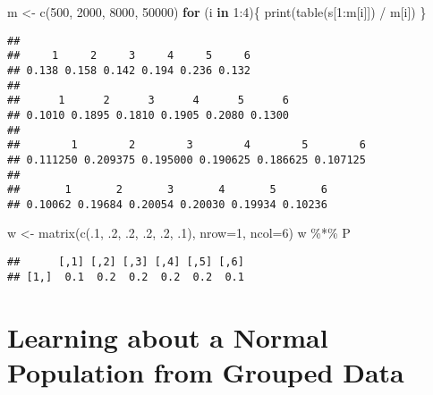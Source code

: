 \documentclass[
]{book}
\newenvironment{Shaded}{\begin{snugshade}}{\end{snugshade}}
\newcommand{\AttributeTok}[1]{\textcolor[rgb]{0.77,0.63,0.00}{#1}}
\newcommand{\ControlFlowTok}[1]{\textcolor[rgb]{0.13,0.29,0.53}{\textbf{#1}}}
\newcommand{\DecValTok}[1]{\textcolor[rgb]{0.00,0.00,0.81}{#1}}
\newcommand{\FunctionTok}[1]{\textcolor[rgb]{0.00,0.00,0.00}{#1}}
\newcommand{\NormalTok}[1]{#1}
\newcommand{\OtherTok}[1]{\textcolor[rgb]{0.56,0.35,0.01}{#1}}
\newcommand{\SpecialCharTok}[1]{\textcolor[rgb]{0.00,0.00,0.00}{#1}}
\begin{document}
\begin{Shaded}
\begin{Highlighting}[]
\NormalTok{m }\OtherTok{\textless{}{-}} \FunctionTok{c}\NormalTok{(}\DecValTok{500}\NormalTok{, }\DecValTok{2000}\NormalTok{, }\DecValTok{8000}\NormalTok{, }\DecValTok{50000}\NormalTok{)}
\ControlFlowTok{for}\NormalTok{ (i }\ControlFlowTok{in} \DecValTok{1}\SpecialCharTok{:}\DecValTok{4}\NormalTok{)\{}
   \FunctionTok{print}\NormalTok{(}\FunctionTok{table}\NormalTok{(s[}\DecValTok{1}\SpecialCharTok{:}\NormalTok{m[i]]) }\SpecialCharTok{/}\NormalTok{ m[i])}
\NormalTok{\}}
\end{Highlighting}
\end{Shaded}

\begin{verbatim}
## 
##     1     2     3     4     5     6 
## 0.138 0.158 0.142 0.194 0.236 0.132 
## 
##      1      2      3      4      5      6 
## 0.1010 0.1895 0.1810 0.1905 0.2080 0.1300 
## 
##        1        2        3        4        5        6 
## 0.111250 0.209375 0.195000 0.190625 0.186625 0.107125 
## 
##       1       2       3       4       5       6 
## 0.10062 0.19684 0.20054 0.20030 0.19934 0.10236
\end{verbatim}

\begin{Shaded}
\begin{Highlighting}[]
\NormalTok{w }\OtherTok{\textless{}{-}} \FunctionTok{matrix}\NormalTok{(}\FunctionTok{c}\NormalTok{(.}\DecValTok{1}\NormalTok{, .}\DecValTok{2}\NormalTok{, .}\DecValTok{2}\NormalTok{, .}\DecValTok{2}\NormalTok{, .}\DecValTok{2}\NormalTok{, .}\DecValTok{1}\NormalTok{), }
            \AttributeTok{nrow=}\DecValTok{1}\NormalTok{, }\AttributeTok{ncol=}\DecValTok{6}\NormalTok{)}
\NormalTok{w }\SpecialCharTok{\%*\%}\NormalTok{ P}
\end{Highlighting}
\end{Shaded}

\begin{verbatim}
##      [,1] [,2] [,3] [,4] [,5] [,6]
## [1,]  0.1  0.2  0.2  0.2  0.2  0.1
\end{verbatim}

\hypertarget{learning-about-a-normal-population-from-grouped-data}{%
\section{Learning about a Normal Population from Grouped Data}\label{learning-about-a-normal-population-from-grouped-data}}
\end{document}
